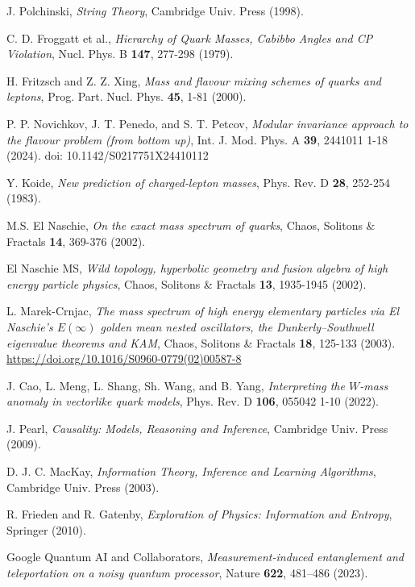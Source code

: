 \documentclass[%
  amsmath,amssymb,
  aps,
 prb,
 floatfix, showkeys
 ]{revtex4-2}
\begin{document}
\begin{thebibliography}{99}
     J. Polchinski, {\it String Theory}, Cambridge Univ. Press (1998).
 
   C. D. Froggatt et al.,
 {\it Hierarchy of Quark Masses, Cabibbo Angles and CP Violation},
   Nucl. Phys. B {\bf 147}, 277-298 (1979).
 
   H. Fritzsch and  Z. Z. Xing,
   { \it Mass and flavour mixing schemes of quarks and leptons},
   Prog. Part. Nucl. Phys. {\bf 45}, 1-81 (2000).
 
  P. P. Novichkov,  J. T. Penedo, and  S. T. Petcov, 
     {\it Modular invariance approach to the flavour problem (from bottom up)},
     Int. J. Mod. Phys. A {\bf 39},  2441011 1-18  (2024). doi: 10.1142/S0217751X24410112
     
   Y. Koide, {\it New prediction of charged‐lepton masses},
   Phys. Rev. D {\bf 28},  252-254 (1983). 
 
   M.S. El Naschie,
   {\it On the exact mass spectrum of quarks}, 
 Chaos, Solitons \& Fractals {\bf  14}, 369-376  (2002).
 
 El Naschie MS,
 {\it Wild topology, hyperbolic geometry and fusion algebra of high energy particle physics},
  Chaos, Solitons \& Fractals {\bf 13}, 1935-1945 (2002).
 
 L.  Marek-Crnjac,
 { \it The mass spectrum of high energy elementary particles via El Naschie’s
  $E(\infty)$ golden mean nested oscillators, the Dunkerly–Southwell eigenvalue theorems and KAM},
   Chaos, Solitons \& Fractals  {\bf 18},  125-133 (2003).
 \url{https://doi.org/10.1016/S0960-0779(02)00587-8}
 
   J. Cao, L. Meng, L.  Shang, Sh.  Wang, and B.  Yang,
 {\it  Interpreting the $W$-mass anomaly in vectorlike quark models},  
  Phys. Rev. D {\bf 106}, 055042  1-10 (2022).
 
 J. Pearl, {\it Causality: Models, Reasoning and Inference}, Cambridge Univ. Press (2009). 
 
   D. J. C. MacKay, {\it Information Theory, Inference and Learning Algorithms}, Cambridge Univ. Press (2003).
 
   R. Frieden and R. Gatenby, {\it Exploration of Physics: Information and Entropy}, Springer (2010).
   
   Google Quantum AI and Collaborators,
   {\it  Measurement-induced entanglement and teleportation on a noisy quantum processor},
   Nature {\bf 622}, 481–486 (2023).  %
 

\end{thebibliography}
\end{document}
